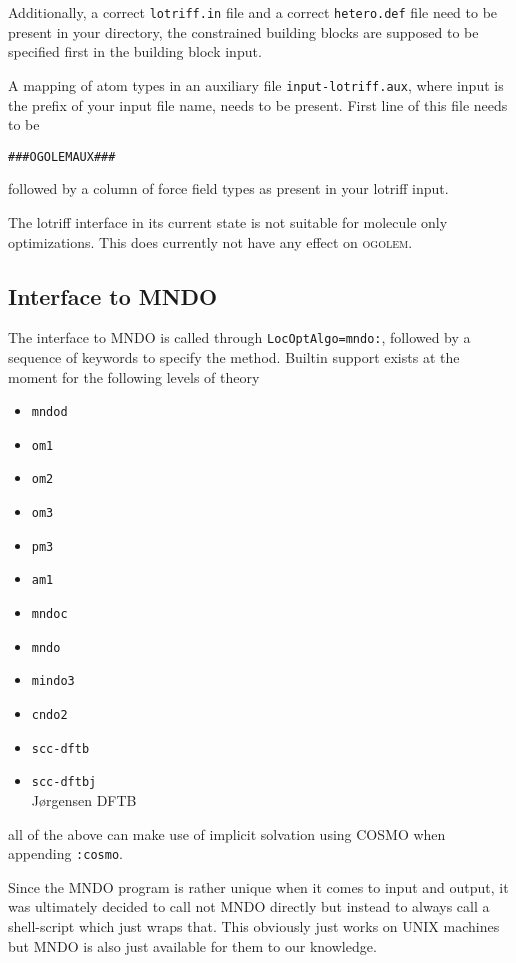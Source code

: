 \documentclass[a4paper,10pt]{scrbook}
\newcommand{\ogo}{\textsc{ogolem}}
\begin{document}
Additionally, a correct \texttt{lotriff.in} file and a correct
\texttt{hetero.def} file need to be present in your directory, the constrained
building blocks are supposed to be specified first in the building block input.

A mapping of atom types in an auxiliary file \texttt{input-lotriff.aux}, where
input is the prefix of your input file name, needs to be present. First line of
this file needs to be
\begin{verbatim}
###OGOLEMAUX###
\end{verbatim}
followed by a column of force field types as present in your lotriff input.

The lotriff interface in its current state is not suitable for molecule only
optimizations. This does currently not have any effect on \ogo{}.

\subsection{Interface to MNDO}
The interface to MNDO is called through \texttt{LocOptAlgo=mndo:}, followed by
a sequence of keywords to specify the method. Builtin support exists at the
moment for the following levels of theory
\begin{itemize}
  \item \texttt{mndod}
  \item \texttt{om1}
  \item \texttt{om2}
  \item \texttt{om3}
  \item \texttt{pm3}
  \item \texttt{am1}
  \item \texttt{mndoc}
  \item \texttt{mndo}
  \item \texttt{mindo3}
  \item \texttt{cndo2}
  \item \texttt{scc-dftb}
  \item \texttt{scc-dftbj}\\
	J\o{}rgensen DFTB
\end{itemize}
all of the above can make use of implicit solvation using COSMO when appending
\texttt{:cosmo}.

Since the MNDO program is rather unique when it comes to input and output, it
was ultimately decided to call not MNDO directly but instead to always call a
shell-script which just wraps that. This obviously just works on UNIX machines
but MNDO is also just available for them to our knowledge.
\end{document}
